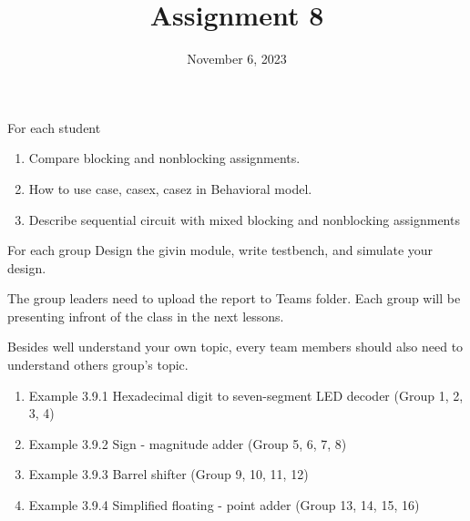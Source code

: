\documentclass{vhdl-assignment}
\title{Assignment 8}
\date{November 6, 2023}
\begin{document}
\maketitle
\thispagestyle{fancy}

\begin{problem}{For each student}
    \begin{enumerate}
        \item Compare blocking and nonblocking assignments.
        \item How to use case, casex, casez in Behavioral model.
        \item Describe sequential circuit with mixed blocking and nonblocking assignments
    \end{enumerate}

\end{problem}

\begin{problem}{For each group}
    Design the givin module, write testbench, and simulate your design.

    The group leaders need to upload the report to Teams folder. Each group will be presenting infront of the class in the next lessons.

    Besides well understand your own topic, every team members should also need to understand others group's topic.
    
    \begin{enumerate}
        \item Example 3.9.1 Hexadecimal digit to seven-segment LED decoder (Group 1, 2, 3, 4)
        \item Example 3.9.2 Sign - magnitude adder (Group 5, 6, 7, 8)
        \item Example 3.9.3 Barrel shifter (Group 9, 10, 11, 12)
        \item Example 3.9.4 Simplified floating - point adder (Group 13, 14, 15, 16)
    \end{enumerate}


\end{problem}
\end{document}
